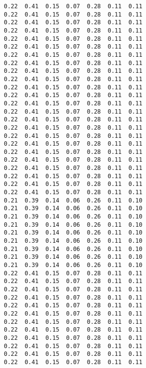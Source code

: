 \begin{lstlisting}
0.22  0.41  0.15  0.07  0.28  0.11  0.11
0.22  0.41  0.15  0.07  0.28  0.11  0.11
0.22  0.41  0.15  0.07  0.28  0.11  0.11
0.22  0.41  0.15  0.07  0.28  0.11  0.11
0.22  0.41  0.15  0.07  0.28  0.11  0.11
0.22  0.41  0.15  0.07  0.28  0.11  0.11
0.22  0.41  0.15  0.07  0.28  0.11  0.11
0.22  0.41  0.15  0.07  0.28  0.11  0.11
0.22  0.41  0.15  0.07  0.28  0.11  0.11
0.22  0.41  0.15  0.07  0.28  0.11  0.11
0.22  0.41  0.15  0.07  0.28  0.11  0.11
0.22  0.41  0.15  0.07  0.28  0.11  0.11
0.22  0.41  0.15  0.07  0.28  0.11  0.11
0.22  0.41  0.15  0.07  0.28  0.11  0.11
0.22  0.41  0.15  0.07  0.28  0.11  0.11
0.22  0.41  0.15  0.07  0.28  0.11  0.11
0.22  0.41  0.15  0.07  0.28  0.11  0.11
0.22  0.41  0.15  0.07  0.28  0.11  0.11
0.22  0.41  0.15  0.07  0.28  0.11  0.11
0.22  0.41  0.15  0.07  0.28  0.11  0.11
0.22  0.41  0.15  0.07  0.28  0.11  0.11
0.22  0.41  0.15  0.07  0.28  0.11  0.11
0.22  0.41  0.15  0.07  0.28  0.11  0.11
0.22  0.41  0.15  0.07  0.28  0.11  0.11
0.21  0.39  0.14  0.06  0.26  0.11  0.10
0.21  0.39  0.14  0.06  0.26  0.11  0.10
0.21  0.39  0.14  0.06  0.26  0.11  0.10
0.21  0.39  0.14  0.06  0.26  0.11  0.10
0.21  0.39  0.14  0.06  0.26  0.11  0.10
0.21  0.39  0.14  0.06  0.26  0.11  0.10
0.21  0.39  0.14  0.06  0.26  0.11  0.10
0.21  0.39  0.14  0.06  0.26  0.11  0.10
0.21  0.39  0.14  0.06  0.26  0.11  0.10
0.22  0.41  0.15  0.07  0.28  0.11  0.11
0.22  0.41  0.15  0.07  0.28  0.11  0.11
0.22  0.41  0.15  0.07  0.28  0.11  0.11
0.22  0.41  0.15  0.07  0.28  0.11  0.11
0.22  0.41  0.15  0.07  0.28  0.11  0.11
0.22  0.41  0.15  0.07  0.28  0.11  0.11
0.22  0.41  0.15  0.07  0.28  0.11  0.11
0.22  0.41  0.15  0.07  0.28  0.11  0.11
0.22  0.41  0.15  0.07  0.28  0.11  0.11
0.22  0.41  0.15  0.07  0.28  0.11  0.11
0.22  0.41  0.15  0.07  0.28  0.11  0.11
0.22  0.41  0.15  0.07  0.28  0.11  0.11


\end{lstlisting}
